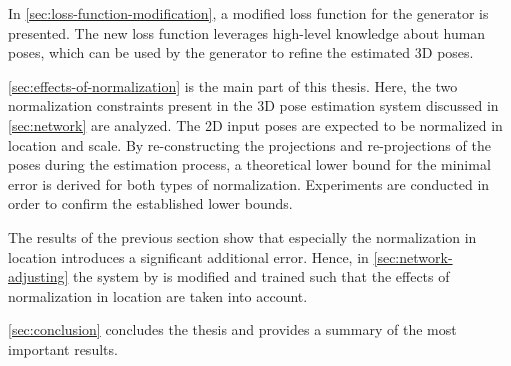 In \autoref{sec:loss-function-modification}, a modified loss function for the generator is presented.
The new loss function leverages high-level knowledge about human poses, which can be used by the generator to refine the estimated 3D poses.

\autoref{sec:effects-of-normalization} is the main part of this thesis.
Here, the two normalization constraints present in the 3D pose estimation system discussed in \autoref{sec:network} are analyzed.
The 2D input poses are expected to be normalized in location and scale.
By re-constructing the projections and re-projections of the poses during the estimation process, a theoretical lower bound for the minimal error is derived for both types of normalization.
Experiments are conducted in order to confirm the established lower bounds.

The results of the previous section show that especially the normalization in location introduces a significant additional error.
Hence, in \autoref{sec:network-adjusting} the system by \citet{drover18} is modified and trained such that the effects of normalization in location are taken into account.

\autoref{sec:conclusion} concludes the thesis and provides a summary of the most important results.